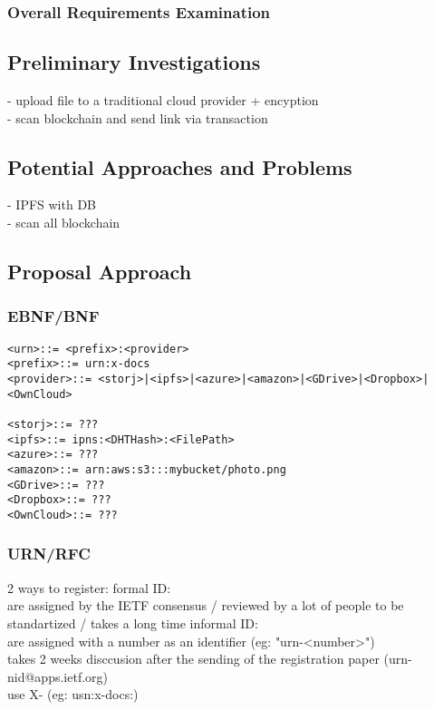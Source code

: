  
\subsubsection{Overall Requirements Examination}

\subsection{Preliminary Investigations}
- upload file to a traditional cloud provider + encyption
\\
- scan blockchain and send link via transaction
\subsection{Potential Approaches and Problems}
- IPFS with DB
\\
- scan all blockchain
\subsection{Proposal Approach}

\subsubsection{EBNF/BNF}

\begin{verbatim}
<urn>::= <prefix>:<provider>
<prefix>::= urn:x-docs
<provider>::= <storj>|<ipfs>|<azure>|<amazon>|<GDrive>|<Dropbox>|<OwnCloud>

<storj>::= ???
<ipfs>::= ipns:<DHTHash>:<FilePath>
<azure>::= ???
<amazon>::= arn:aws:s3:::mybucket/photo.png
<GDrive>::= ???
<Dropbox>::= ???
<OwnCloud>::= ???
\end{verbatim}

\subsubsection{URN/RFC}

2 ways to register:
formal ID:\\
are assigned by the IETF consensus / reviewed by a lot of people to be standartized / takes a long time
informal ID: \\
are assigned with a number as an identifier (eg: "urn-<number>") \\
takes 2 weeks disccusion after the sending of the registration paper (urn-nid@apps.ietf.org)
\\

use X- (eg: usn:x-docs:)

